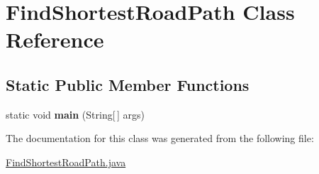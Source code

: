 \hypertarget{class_find_shortest_road_path}{\section{Find\+Shortest\+Road\+Path Class Reference}
\label{class_find_shortest_road_path}
}
\subsection*{Static Public Member Functions}
\begin{DoxyCompactItemize}
\item 
\hypertarget{class_find_shortest_road_path_a4c742064cbfb91124a1fc7126103b425}{static void {\bfseries main} (String\mbox{[}$\,$\mbox{]} args)}\label{class_find_shortest_road_path_a4c742064cbfb91124a1fc7126103b425}

\end{DoxyCompactItemize}


The documentation for this class was generated from the following file\+:\begin{DoxyCompactItemize}
\item 
\hyperlink{_find_shortest_road_path_8java}{Find\+Shortest\+Road\+Path.\+java}\end{DoxyCompactItemize}
